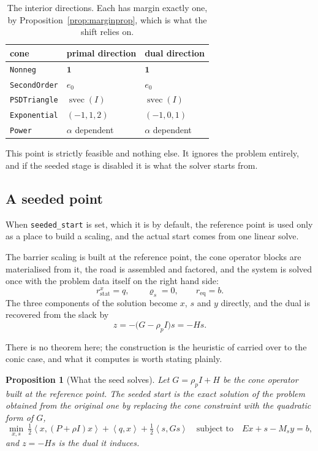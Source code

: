 \documentclass[a4paper,11pt]{book}
\theoremstyle{plain}
\newtheorem{proposition}[theorem]{Proposition}
\theoremstyle{definition}
\theoremstyle{remark}
\numberwithin{equation}{chapter}
\numberwithin{algorithm}{chapter}
\newcommand{\inner}[2]{\left\langle #1, #2 \right\rangle}
\newcommand{\svec}{\operatorname{svec}}
\begin{document}
	\begin{table}[H]
		\centering\small
		\begin{tabular}{lll}
			\toprule
			cone & primal direction & dual direction\\
			\midrule
			\texttt{Nonneg} & $\mathbf{1}$ & $\mathbf{1}$\\
			\texttt{SecondOrder} & $e_0$ & $e_0$\\
			\texttt{PSDTriangle} & $\svec(I)$ & $\svec(I)$\\
			\texttt{Exponential} & $(-1,1,2)$ & $(-1,0,1)$\\
			\texttt{Power} & $\alpha$ dependent & $\alpha$ dependent\\
			\bottomrule
		\end{tabular}
		\caption{The interior directions. Each has margin exactly one, by
			Proposition~\ref{prop:marginprop}, which is what the shift relies on.}
	\end{table}

	This point is strictly feasible and nothing else. It ignores the problem
	entirely, and if the seeded stage is disabled it is what the solver starts
	from.

	\subsection{A seeded point}

	When \texttt{seeded\_start} is set, which it is by default, the reference
	point is used only as a place to build a scaling, and the actual start comes
	from one linear solve.

	The barrier scaling is built at the reference point, the cone operator blocks
	are materialised from it, the road is assembled and factored, and the system
	is solved once with the problem data itself on the right hand side:
	\[
	r^{x}_{\mathrm{stat}}=q,
	\qquad
	\varrho_s=0,
	\qquad
	r_{\mathrm{eq}}=b .
	\]
	The three components of the solution become $x$, $s$ and $y$ directly, and
	the dual is recovered from the slack by
	\[
	z=-\bigl(G-\rho_pI\bigr)s=-Hs .
	\]

	There is no theorem here; the construction is the heuristic of
	\cite{Mehrotra1992} carried over to the conic case, and what it computes is
	worth stating plainly.

	\begin{proposition}[What the seed solves]\label{prop:seed}
		Let $G=\rho_pI+H$ be the cone operator built at the reference point. The
		seeded start is the exact solution of the problem obtained from the
		original one by replacing the cone constraint with the quadratic form of
		$G$,
		\begin{equation}
			\min_{x,s}\
			\tfrac12\inner{x}{(P+\rho I)x}+\inner{q}{x}+\tfrac12\inner{s}{Gs}
			\quad\text{subject to}\quad
			Ex+s-M_sy=b ,
		\end{equation}
		and $z=-Hs$ is the dual it induces.
	\end{proposition}
\end{document}
